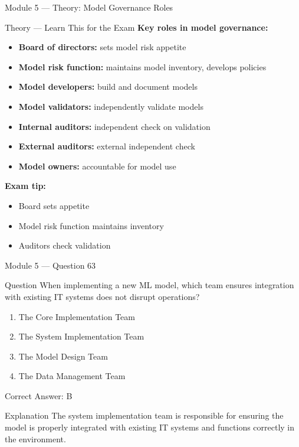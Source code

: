 \documentclass[aspectratio=169,10pt]{beamer}
\newcommand{\question}[1]{%
	\begin{block}{Question}
		#1
	\end{block}
}
\newcommand{\options}[4]{%
	\begin{enumerate}[label=\Alph*.,leftmargin=*]
		\item #1
		\item #2
		\item #3
		\item #4
	\end{enumerate}
}
\newcommand{\answerbox}[1]{%
	\begin{exampleblock}{Correct Answer: #1}
	\end{exampleblock}
}
\newcommand{\explain}[1]{%
	\begin{block}{Explanation}
		\small #1
	\end{block}
}
\newcommand{\theory}[1]{%
	\begin{block}{Theory --- Learn This for the Exam}
		\small #1
	\end{block}
}
\begin{document}
	\begin{frame}{Module 5 --- Theory: Model Governance Roles}
		\theory{
			\textbf{Key roles in model governance:}
			\begin{itemize}
				\item \textbf{Board of directors:} sets model risk appetite
				\item \textbf{Model risk function:} maintains model inventory, develops policies
				\item \textbf{Model developers:} build and document models
				\item \textbf{Model validators:} independently validate models
				\item \textbf{Internal auditors:} independent check on validation
				\item \textbf{External auditors:} external independent check
				\item \textbf{Model owners:} accountable for model use
			\end{itemize}
			\textbf{Exam tip:}
			\begin{itemize}
				\item Board sets appetite
				\item Model risk function maintains inventory
				\item Auditors check validation
			\end{itemize}
		}
	\end{frame}
	
	\begin{frame}{Module 5 --- Question 63}
		\question{When implementing a new ML model, which team ensures integration with existing IT systems does not disrupt operations?}
		\options{The Core Implementation Team}{The System Implementation Team}{The Model Design Team}{The Data Management Team}
		\answerbox{B}
		\explain{The system implementation team is responsible for ensuring the model is properly integrated with existing IT systems and functions correctly in the environment.}
	\end{frame}
	
\end{document}
